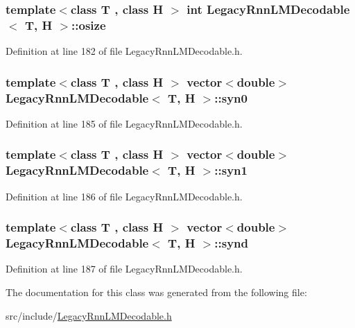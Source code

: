 \subsubsection[{osize}]{\setlength{\rightskip}{0pt plus 5cm}template$<$class T , class H $>$ int {\bf Legacy\+Rnn\+L\+M\+Decodable}$<$ T, H $>$\+::osize}\hypertarget{class_legacy_rnn_l_m_decodable_aa0d56b9470d32fd716222e69747c3c60}{}\label{class_legacy_rnn_l_m_decodable_aa0d56b9470d32fd716222e69747c3c60}


Definition at line 182 of file Legacy\+Rnn\+L\+M\+Decodable.\+h.

\subsubsection[{syn0}]{\setlength{\rightskip}{0pt plus 5cm}template$<$class T , class H $>$ vector$<$double$>$ {\bf Legacy\+Rnn\+L\+M\+Decodable}$<$ T, H $>$\+::syn0}\hypertarget{class_legacy_rnn_l_m_decodable_a7970a61748b32b442452cac1ac5e2950}{}\label{class_legacy_rnn_l_m_decodable_a7970a61748b32b442452cac1ac5e2950}


Definition at line 185 of file Legacy\+Rnn\+L\+M\+Decodable.\+h.

\subsubsection[{syn1}]{\setlength{\rightskip}{0pt plus 5cm}template$<$class T , class H $>$ vector$<$double$>$ {\bf Legacy\+Rnn\+L\+M\+Decodable}$<$ T, H $>$\+::syn1}\hypertarget{class_legacy_rnn_l_m_decodable_a1f129bf4f36b2ac9126f05b7c9c8e8c3}{}\label{class_legacy_rnn_l_m_decodable_a1f129bf4f36b2ac9126f05b7c9c8e8c3}


Definition at line 186 of file Legacy\+Rnn\+L\+M\+Decodable.\+h.

\subsubsection[{synd}]{\setlength{\rightskip}{0pt plus 5cm}template$<$class T , class H $>$ vector$<$double$>$ {\bf Legacy\+Rnn\+L\+M\+Decodable}$<$ T, H $>$\+::synd}\hypertarget{class_legacy_rnn_l_m_decodable_a96b89f4d7e8b92da114cdf0db630b500}{}\label{class_legacy_rnn_l_m_decodable_a96b89f4d7e8b92da114cdf0db630b500}


Definition at line 187 of file Legacy\+Rnn\+L\+M\+Decodable.\+h.



The documentation for this class was generated from the following file\+:\begin{DoxyCompactItemize}
\item 
src/include/\hyperlink{_legacy_rnn_l_m_decodable_8h}{Legacy\+Rnn\+L\+M\+Decodable.\+h}\end{DoxyCompactItemize}
